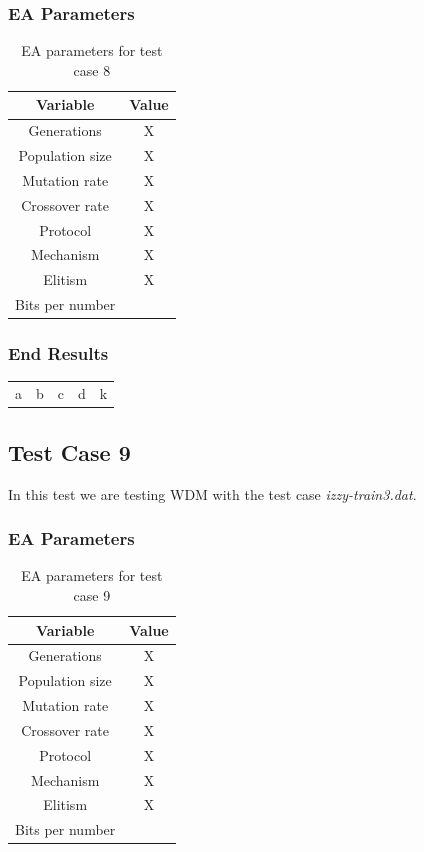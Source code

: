 \subsubsection{EA Parameters}\label{sec:test-case-8-parameters}
\begin{table}
	\begin{tabular}{c c}
		Variable & Value \\
		\hline
		Generations & X \\
		\hline
		Population size & X \\
		\hline
		Mutation rate & X \\
		\hline
		Crossover rate & X \\
		\hline
		Protocol & X \\
		\hline
		Mechanism & X \\
		\hline
		Elitism & X \\
		\hline
		Bits per number & \\
	\end{tabular}
	\caption{EA parameters for test case 8}
\end{table}
\subsubsection{End Results}\label{sec:test-case-8-results}
\begin{table}
	\begin{tabular}{c c c c c}
		a & b & c & d & k \\
	\end{tabular}
\end{table}

\subsection{Test Case 9}\label{sec:test-case-9}
In this test we are testing WDM with the test case
\textit{izzy-train3.dat}.
\subsubsection{EA Parameters}\label{sec:test-case-9-parameters}
\begin{table}
	\begin{tabular}{c c}
		Variable & Value \\
		\hline
		Generations & X \\
		\hline
		Population size & X \\
		\hline
		Mutation rate & X \\
		\hline
		Crossover rate & X \\
		\hline
		Protocol & X \\
		\hline
		Mechanism & X \\
		\hline
		Elitism & X \\
		\hline
		Bits per number & \\
	\end{tabular}
	\caption{EA parameters for test case 9}
\end{table}
